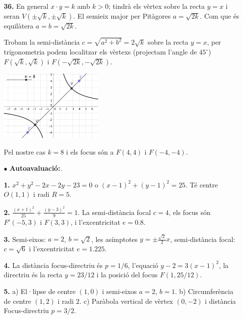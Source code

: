 \documentclass[a4paper, pdf, twoside]{book}
\begin{document}
\begin{multicols}{2}
\begin{enumerate}
\vspace{0.25cm}
\item[\fontfamily{phv}\selectfont\color{blue}\textbf{36. }] 
En general $x\cdot y=k$ amb $k>0$; tindrà els vèrtex sobre la recta $y=x$ i seran $V(\pm \sqrt {k}, \pm \sqrt {k})$. El semieix major per Pitàgores $a=\sqrt {2k}$. Com que és equilàtera $a=b=\sqrt {2k}$. \par Trobam la semi-distància $c=\sqrt {a^2+b^2}=2\sqrt {k}$ sobre la recta $y=x$, per trigonometria podem localitzar els vèrtexs (projectam l'angle de $45^\circ $) $F(\sqrt {k},\sqrt {k})$ i $F(-\sqrt {2k},-\sqrt {2k})$. \par \includegraphics [width=0.4\textwidth ]{img-sol/t10-34} \par Pel nostre cas $k=8$ i els focus són a $F(4,4)$ i $F(-4,-4)$. 
\vspace{0.25cm}
 \item[$\bullet$ ] {\selectfont\color{blue}\textbf{Autoavaluació:}. }

\vspace{0.25cm}
\item[\fontfamily{phv}\selectfont\color{blue}\textbf{1. }]  \scalebox{0.6}{\simbolclau } 
$x^2+y^2-2x-2y-23=0$ o $(x-1)^2+(y-1)^2=25$. Té centre $O(1,1)$ i radi $R=5$.
\vspace{0.25cm}
\item[\fontfamily{phv}\selectfont\color{blue}\textbf{2. }]  \scalebox{0.6}{\simbolclau } 
$\frac {(x+1)^2}{25}+\frac {(y-3)^2}{9}=1$. La semi-distància focal $c=4$, els focus són $F'(-5,3)$ i $F(3,3)$, i l'excentricitat $e=0.8$.
\vspace{0.25cm}
\item[\fontfamily{phv}\selectfont\color{blue}\textbf{3. }]  \scalebox{0.6}{\simbolclau } 
Semi-eixos: $a=2$, $b=\sqrt {2}$, les asímptotes $y=\pm \frac {\sqrt {2}}{2}x$, semi-distància focal: $c=\sqrt {6}$ i l'excentricitat $e=1.225$.
\vspace{0.25cm}
\item[\fontfamily{phv}\selectfont\color{blue}\textbf{4. }]  \scalebox{0.6}{\simbolclau } 
La distància focus-directriu és $p=1/6$, l'equació $y-2=3 (x-1)^2$, la directriu és la recta $y=23/12$ i la posició del focus $F(1, 25/12)$.
\vspace{0.25cm}
\item[\fontfamily{phv}\selectfont\color{blue}\textbf{5. }]  \scalebox{0.6}{\simbolclau } 
a) El·lipse de centre $(1,0)$ i semi-eixos $a=2$, $b=1$. b) Circumferència de centre $(1,2)$ i radi $2$. c) Paràbola vertical de vèrtex $(0,-2)$ i distància Focus-directriu $p=3/2$.
 \end{enumerate}
\vfill\null
\columnbreak
\def\currentname{Solucions del Bloc III}
\vspace*{0.75cm}


\end{multicols}
\end{document}
